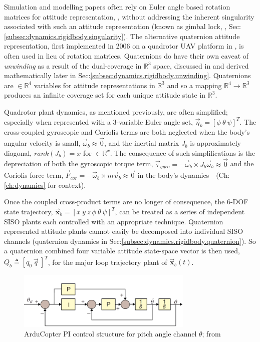\par
Simulation and modelling papers often rely on Euler angle based rotation matrices for attitude representation, \cite{adaptivedisturbancecontrol, optimizedpidquadcopter, singleaxistilting, backsteppingquadcoptercontrol, fullquadcoptercontrol}, without addressing the inherent singularity associated with such an attitude representation (known as gimbal lock, \cite{euleranglesingularity}, Sec:\ref{subsec:dynamics.rigidbody.singularity}). The alternative quaternion attitude representation, first implemented in 2006 on a quadrotor UAV platform in \cite{attitudestabilization}, is often used in lieu of rotation matrices. Quaternions do have their own caveat of \emph{unwinding} as a result of the dual-coverage in $\mathbb{R}^3$ space, discussed in \cite{unwinding} and derived mathematically later in Sec:\ref{subsec:dynamics.rigidbody.unwinding}. Quaternions are $\in\mathbb{R}^4$ variables for attitude representations in $\mathbb{R}^3$ and so a mapping $\mathbb{R}^4\rightarrow\mathbb{R}^3$ produces an infinite coverage set for each unique attitude state in $\mathbb{R}^3$.
\par
Quadrotor plant dynamics, as mentioned previously, are often simplified; especially when represented with a 3-variable Euler angle set, $\vec{\eta}_b = [\phi ~\theta ~\psi]^T$. The cross-coupled gyroscopic and Coriolis terms are both neglected when the body's angular velocity is small, $\vec{\omega}_b \approx \vec{0}$, and the inertial matrix $J_b$ is approximately diagonal, $rank(J_b)= x$ for $\in\mathbb{R}^x$. The consequence of such simplifications is the depreciation of both the gyroscopic torque term, $\vec{\tau}_{gyro}=-\vec{\omega}_b \times J_b\vec{\omega}_b \approx \vec{0}$ and the  Coriolis force term, $\vec{F}_{cor}=-\vec{\omega}_b \times m\vec{v}_b \approx \vec{0}$ in the body's dynamics~~(Ch:\ref{ch:dynamics} for context). 
\par
Once the coupled cross-product terms are no longer of consequence, the 6-DOF state trajectory, $\vec{\mathbf{x}}_b=[x ~y ~z ~\phi ~\theta ~\psi]^T$, can be treated as a series of independent SISO plants each controlled with an appropriate technique. Quaternion represented attitude plants cannot easily be decomposed into individual SISO channels (quaternion dynamics in Sec:\ref{subsec:dynamics.rigidbody.quaternion}). So a quaternion combined four variable attitude state-space vector is then used, $Q_b \triangleq [q_0 ~\vec{q}\>]^T$, for the major loop trajectory plant of $\vec{\mathbf{x}}_b(t)$.
\begin{figure}[hbtp]
\vspace{-8pt}
\centering
\includegraphics[width=0.75\textwidth]{figs/arducopter-pi}
\vspace{-2pt}
\caption{ArduCopter PI control structure for pitch angle channel $\theta$; from~\cite{buildyourownquad}}
\label{fig:arducopter-pi}
\vspace{-10pt}
\end{figure}
